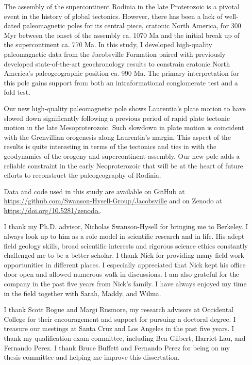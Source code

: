 \documentclass{ucbthesis}
\begin{document}
\begin{frontmatter}
\begin{preface}
The assembly of the supercontinent Rodinia in the late Proterozoic is a pivotal event in the history of global tectonics. However, there has been a lack of well-dated paleomagnetic poles for its central piece, cratonic North America, for 300 Myr between the onset of the assembly ca. 1070 Ma and the initial break up of the supercontinent ca. 770 Ma. In this study, I developed high-quality paleomagnetic data from the Jacobsville Formation paired with previously developed state-of-the-art geochronology results to constrain cratonic North America's paleogeographic position ca. 990 Ma. The primary interpretation for this pole gains support from both an intraformational conglomerate test and a fold test. 
 
Our new high-quality paleomagnetic pole shows Laurentia's plate motion to have slowed down significantly following a previous period of rapid plate tectonic motion in the late Mesoproterozoic. Such slowdown in plate motion is coincident with the Grenvillian orogenesis along Laurentia's margin. This aspect of the results is quite interesting in terms of the tectonics and ties in with the geodynamics of the orogeny and supercontinent assembly. Our new pole adds a reliable constraint in the early Neoproterozoic that will be at the heart of future efforts to reconstruct the paleogeography of Rodinia.

Data and code used in this study are available on GitHub at \url{https://github.com/Swanson-Hysell-Group/Jacobsville} and on Zenodo at \url{https://doi.org/10.5281/zenodo.}.

\end{preface}

\begin{acknowledgements}
I thank my Ph.D. advisor, Nicholas Swanson-Hysell for bringing me to Berkeley. I always look up to him as a role model in scientific research and in life. His adept field geology skills, broad scientific interests and rigorous science ethics constantly challenged me to be a better scholar. I thank Nick for providing many field work opportunities in different places. I especially appreciated that Nick kept his office door open and allowed numerous walk-in discussions. I am also grateful for the company in the past five years from Nick's family. I have always enjoyed my time in the field together with Sarah, Maddy, and Wilma. 

I thank Scott Bogue and Margi Rusmore, my research advisors at Occidental College for their encouragement and support for pursuing a doctoral degree. I treasure our meetings at Santa Cruz and Los Angeles in the past five years. I thank my qualification exam committee, including Ben Gilbert, Harriet Lau, and Fernando Perez. I thank Bruce Buffett and Fernando Perez for being on my thesis committee and helping me improve this dissertation. 


\end{acknowledgements}
\end{frontmatter}
\end{document}
